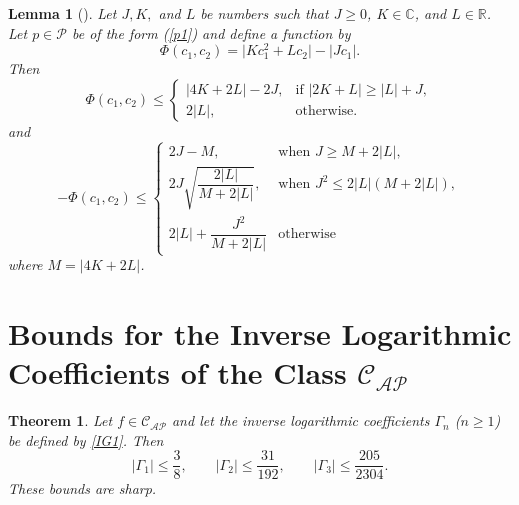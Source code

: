 \documentclass[11pt]{article}
\newtheorem{theo}{Theorem}[section]
\newtheorem{lem}{Lemma}[section]
\numberwithin{equation}{section}
\begin{document}
\begin{lem}[\cite{SimThomas2020}]\label{L6}
Let $J, K,$ and $L$ be numbers such that $J \geq 0$, $K \in \mathbb{C}$, and $L \in \mathbb{R}$. Let $p \in \mathcal{P}$ be of the form (\ref{p1}) and define a function by
\[
\Phi(c_1,c_2) = \big| K c_1^2 + L c_2 \big| - \big| J c_1 \big|.
\]
Then 
\[
\Phi(c_{1}, c_{2}) \le 
\begin{cases}
|4K + 2L| - 2J, & \text{if } |2K + L| \geq |L| + J, \\[6pt]
2|L|, & \text{otherwise.}
\end{cases}
\]
and
\[
-\Phi(c_1,c_2) \leq 
\begin{cases}
2J - M, & \text{when } J \geq M + 2|L|, \\[6pt]
2J \sqrt{\dfrac{ 2|L|}{M + 2|L|}}, & \text{when } J^2 \leq 2|L|(M + 2|L|), \\[10pt]
2|L| +\dfrac{ J^2}{M + 2|L|} & \text{otherwise}
\end{cases}
\]
where $M=|4K+2L|$.
\end{lem}

\section{Bounds for the Inverse Logarithmic Coefficients of the Class $\mathcal{C}_{\mathcal{AP}}$}
\begin{theo}\label{T1}
Let $f \in \mathcal{C}_{\mathcal{AP}}$ and let the inverse logarithmic coefficients $\Gamma_n$ ($n \geq 1$) be defined by \eqref{IG1}. Then 
\[
|\Gamma_1| \le \frac{3}{8}, \qquad |\Gamma_2| \le \frac{31}{192}, \qquad |\Gamma_3| \le \frac{205}{2304}.
\]
These bounds are sharp.
\end{theo}
\end{document}
